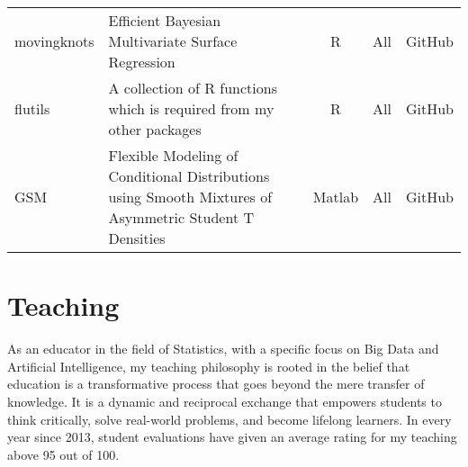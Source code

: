 \documentclass[twoside,a4paper]{article}
\begin{document}
\begin{tabular}{lp{9cm}ccl}
movingknots & Efficient Bayesian Multivariate Surface Regression                                                                   & R        & All         & GitHub       \\
flutils     & A collection of R functions which is required from my other packages                                                 & R        & All         & GitHub       \\
GSM         & Flexible Modeling of Conditional Distributions using Smooth Mixtures of Asymmetric Student T Densities               & Matlab   & All         & GitHub       \\
  \bottomrule
\end{tabular}

\newpage
\section{Teaching}

\indent As an educator in the field of Statistics, with a specific focus on Big Data and Artificial Intelligence, my teaching philosophy is rooted in the belief that education is a transformative process that goes beyond the mere transfer of knowledge. It is a dynamic and reciprocal exchange that empowers students to think critically, solve real-world problems, and become lifelong learners. In every year since 2013, student evaluations have given an average rating for my teaching above 95 out of 100.
\end{document}
